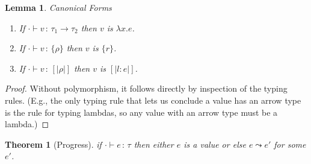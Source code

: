 \documentclass{article}
\newtheorem{theorem}{Theorem}
\newtheorem{lemma}{Lemma}
\newcommand{\variant}[1]{[\!|#1|\!]}
\newcommand{\lam}[2]{\lambda #1 . #2}
\newcommand{\hastp}[3]{#1 \vdash #2 \,:\, #3}
\newcommand{\step}[2]{#1 \leadsto #2}
\begin{document}
\begin{lemma}{Canonical Forms} \label{lem:canonical-forms}
\mbox{}
\begin{enumerate}
\item If $\hastp{\cdot}{v}{\tau_1\to\tau_2}$ then $v$ is $\lam{x}{e}$.
\item If $\hastp{\cdot}{v}{\{\rho\}}$ then $v$ is $\{r\}$.
\item If $\hastp{\cdot}{v}{\variant{\rho}}$ then $v$ is $\variant{l:e}$.
\end{enumerate}
\end{lemma}

\begin{proof}
Without polymorphism, it follows directly by inspection of the typing rules. (E.g.,
the only typing rule that lets us conclude a value has an arrow type is the rule for
typing lambdas, so any value with an arrow type must be a lambda.)
\end{proof}

\begin{theorem}[Progress]
if $\hastp{\cdot}{e}{\tau}$ then either $e$ is a value or else $\step{e}{e'}$ for some $e'$.
\end{theorem}
\end{document}
